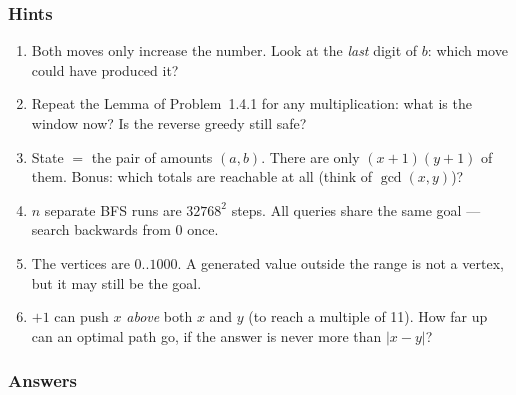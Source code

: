 \subsubsection*{Hints}
\begin{enumerate}[leftmargin=*, label=\textbf{E4.\arabic*}]
    \item Both moves only increase the number. Look at the \emph{last} digit of $b$: which move could have produced it?
    \item Repeat the Lemma of Problem~1.4.1 for any multiplication: what is the window now? Is the reverse greedy still safe?
    \item State $=$ the pair of amounts $(a, b)$. There are only $(x{+}1)(y{+}1)$ of them. Bonus: which totals are reachable at all (think of $\gcd(x,y)$)?
    \item $n$ separate BFS runs are $32768^2$ steps. All queries share the same goal --- search backwards from 0 once.
    \item The vertices are $0..1000$. A generated value outside the range is not a vertex, but it may still be the goal.
    \item $+1$ can push $x$ \emph{above} both $x$ and $y$ (to reach a multiple of 11). How far up can an optimal path go, if the answer is never more than $|x - y|$?
\end{enumerate}

\subsubsection*{Answers}


